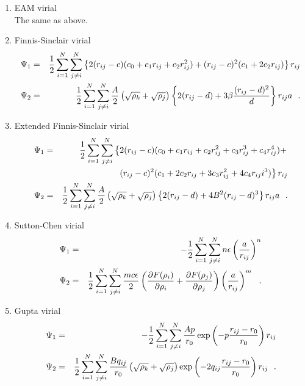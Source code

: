 \begin{enumerate}
\item EAM virial \\
The same as above.
\item Finnis-Sinclair virial
\begin{eqnarray}
\Psi_{1} &=& {1 \over 2} \sum_{i=1}^{N} \sum_{j \ne i}^{N}
\left\{ 2 (r_{ij}-c) (c_{0}+c_{1}r_{ij}+c_{2}r_{ij}^{2}) +
(r_{ij}-c)^{2} (c_{1}+2c_{2}r_{ij}) \right\} r_{ij} \nonumber \\
\Psi_{2} &=& {1 \over 2} \sum_{i=1}^{N} \sum_{j \ne i}^{N}
{A \over 2} \left( \sqrt{\rho_{k}} + \sqrt{\rho_{j}} \right)
\left\{ 2(r_{ij}-d) + 3 \beta \frac{(r_{ij}-d)^{2}}{d} \right\} r_{ij}a~~.
\end{eqnarray}
\item Extended Finnis-Sinclair virial
\begin{eqnarray}
\Psi_{1} &=& {1 \over 2} \sum_{i=1}^{N} \sum_{j \ne i}^{N}
\left\{ 2 (r_{ij}-c) (c_{0}+c_{1}r_{ij}+c_{2}r_{ij}^{2}+c_{3}r_{ij}^{3}+c_{4}r_{ij}^{4}) + \right. \nonumber \\
& & \phantom{xxxxxxxx} \left. (r_{ij}-c)^{2} (c_{1}+2c_{2}r_{ij}+3c_{3}r_{ij}^{2}+4c_{4}r_{ij}i^{3}) \right\} r_{ij} \\
\Psi_{2} &=& {1 \over 2} \sum_{i=1}^{N} \sum_{j \ne i}^{N}
{A \over 2} \left( \sqrt{\rho_{k}} + \sqrt{\rho_{j}} \right)
\left\{ 2(r_{ij}-d) + 4 B^{2} (r_{ij}-d)^{3} \right\} r_{ij}a~~. \nonumber
\end{eqnarray}
\item Sutton-Chen virial
\begin{eqnarray}
\Psi_{1} &=& -{1 \over 2} \sum_{i=1}^{N} \sum_{j \ne i}^{N} n \epsilon \left( \frac{a}{r_{ij}} \right)^{n} \nonumber \\
\Psi_{2} &=& {1 \over 2} \sum_{i=1}^{N} \sum_{j \ne i}^{N} \frac{m c \epsilon}{2} \left( \frac{\partial F(\rho_{i})}{\partial \rho_{i}} +
\frac{\partial F(\rho_{j})}{\partial \rho_{j}} \right) \left( \frac{a}{r_{ij}} \right)^{m}~~.
\end{eqnarray}
\item Gupta virial
\begin{eqnarray}
\Psi_{1} &=& -{1 \over 2} \sum_{i=1}^{N} \sum_{j \ne i}^{N}
\frac{A p}{r_{0}} \exp \left( -p \frac{r_{ij}-r_{0}}{r_{0}} \right) r_{ij} \nonumber \\
\Psi_{2} &=& {1 \over 2} \sum_{i=1}^{N} \sum_{j \ne i}^{N} \frac{B q_{ij}}{r_{0}}
\left( \sqrt{\rho_{k}} + \sqrt{\rho_{j}} \right)
\exp \left( -2 q_{ij} \frac{r_{ij}-r_{0}}{r_{0}} \right) r_{ij}~~.
\end{eqnarray}
\end{enumerate}

